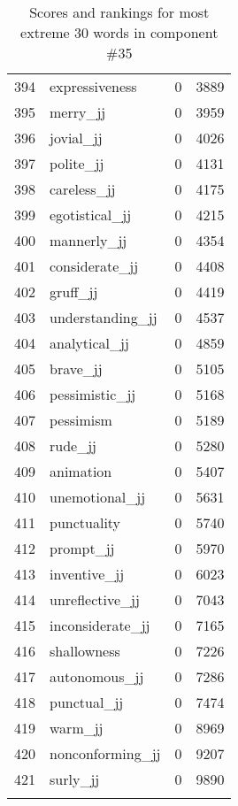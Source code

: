 \begin{longtable}[!htbp]{| rlr@{.}l |}
    394 & expressiveness & 0 & 3889 \\
    395 & merry\_jj & 0 & 3959 \\
    396 & jovial\_jj & 0 & 4026 \\
    397 & polite\_jj & 0 & 4131 \\
    398 & careless\_jj & 0 & 4175 \\
    399 & egotistical\_jj & 0 & 4215 \\
    400 & mannerly\_jj & 0 & 4354 \\
    401 & considerate\_jj & 0 & 4408 \\
    402 & gruff\_jj & 0 & 4419 \\
    403 & understanding\_jj & 0 & 4537 \\
    404 & analytical\_jj & 0 & 4859 \\
    405 & brave\_jj & 0 & 5105 \\
    406 & pessimistic\_jj & 0 & 5168 \\
    407 & pessimism & 0 & 5189 \\
    408 & rude\_jj & 0 & 5280 \\
    409 & animation & 0 & 5407 \\
    410 & unemotional\_jj & 0 & 5631 \\
    411 & punctuality & 0 & 5740 \\
    412 & prompt\_jj & 0 & 5970 \\
    413 & inventive\_jj & 0 & 6023 \\
    414 & unreflective\_jj & 0 & 7043 \\
    415 & inconsiderate\_jj & 0 & 7165 \\
    416 & shallowness & 0 & 7226 \\
    417 & autonomous\_jj & 0 & 7286 \\
    418 & punctual\_jj & 0 & 7474 \\
    419 & warm\_jj & 0 & 8969 \\
    420 & nonconforming\_jj & 0 & 9207 \\
    421 & surly\_jj & 0 & 9890 \\
    \hline
    \caption{Scores and rankings for most extreme 30 words in component \#35} \\
\end{longtable}

